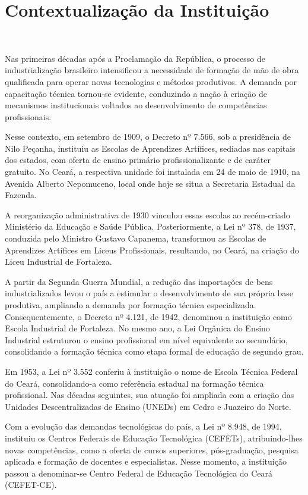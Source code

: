 

\section{Contextualização da Instituição}
~ %
 
Nas primeiras décadas após a Proclamação da República, o processo de industrialização brasileiro intensificou a necessidade de formação de mão de obra qualificada para operar novas tecnologias e métodos produtivos. A demanda por capacitação técnica tornou-se evidente, conduzindo a nação à criação de mecanismos institucionais voltados ao desenvolvimento de competências profissionais.

Nesse contexto, em setembro de 1909, o Decreto nº 7.566, sob a presidência de Nilo Peçanha, instituiu as Escolas de Aprendizes Artífices, sediadas nas capitais dos estados, com oferta de ensino primário profissionalizante e de caráter gratuito. No Ceará, a respectiva unidade foi instalada em 24 de maio de 1910, na Avenida Alberto Nepomuceno, local onde hoje se situa a Secretaria Estadual da Fazenda.

A reorganização administrativa de 1930 vinculou essas escolas ao recém-criado Ministério da Educação e Saúde Pública. Posteriormente, a Lei nº 378, de 1937, conduzida pelo Ministro Gustavo Capanema, transformou as Escolas de Aprendizes Artífices em Liceus Profissionais, resultando, no Ceará, na criação do Liceu Industrial de Fortaleza.

A partir da Segunda Guerra Mundial, a redução das importações de bens industrializados levou o país a estimular o desenvolvimento de sua própria base produtiva, ampliando a demanda por formação técnica especializada. Consequentemente, o Decreto nº 4.121, de 1942, denominou a instituição como Escola Industrial de Fortaleza. No mesmo ano, a Lei Orgânica do Ensino Industrial estruturou o ensino profissional em nível equivalente ao secundário, consolidando a formação técnica como etapa formal de educação de segundo grau.

Em 1953, a Lei nº 3.552 conferiu à instituição o nome de Escola Técnica Federal do Ceará, consolidando-a como referência estadual na formação técnica profissional. Nas décadas seguintes, sua atuação foi ampliada com a criação das Unidades Descentralizadas de Ensino (UNEDs) em Cedro e Juazeiro do Norte.

Com a evolução das demandas tecnológicas do país, a Lei nº 8.948, de 1994, instituiu os Centros Federais de Educação Tecnológica (CEFETs), atribuindo-lhes novas competências, como a oferta de cursos superiores, pós-graduação, pesquisa aplicada e formação de docentes e especialistas. Nesse momento, a instituição passou a denominar-se Centro Federal de Educação Tecnológica do Ceará (CEFET-CE).

